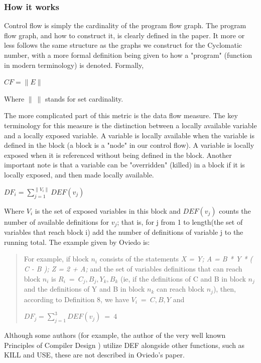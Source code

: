 \documentclass[]{article}
\begin{document}
\subsubsection{How it works}

Control flow is simply the cardinality of the program flow graph.
The program flow graph, and how to construct it, is clearly defined in the paper.
It more or less follows the same structure as the graphs we construct for the Cyclomatic number, with a more formal definition being given to how a "program" (function in modern terminology) is denoted.
Formally,

$CF=\parallel E\parallel$

Where $\parallel ~\parallel$ stands for set cardinality.

The more complicated part of this metric is the data flow measure.
The key terminology for this measure is the distinction between a locally available variable and a locally exposed variable.
A variable is locally available when the variable is defined in the block (a block is a "node" in our control flow).
A variable is locally exposed when it is referenced without being defined in the block.
Another important note is that a variable can be "overridden" (killed) in a block if it is locally exposed, and then made locally available.

$DF_i = \sum\limits_{j=1}^{\parallel V_i \parallel} DEF(v_j)$

Where $V_i$ is the set of exposed variables in this block and $DEF(v_j)$ counts the number of available definitions for $v_j$; that is, for j from 1 to length(the set of variables that reach block i) add the number of definitions of variable j to the running total.
The example given by Oviedo is:
\begin{quotation}
	For example, if block $n_i$ consists of the statements \textit{X = Y; A = B * Y * ( C - B ); Z = 2 + A;} and the set of variables definitions that can reach block $n_i$ is $R_i ~= ~{C_j, B_j, Y_k, B_k}$ (ie, if the definitions of C and B in block $n_j$ and the definitions of Y and B in block $n_k$ can reach block $n_j$), then, according to Definition 8, we have $V_i ~= ~{C,B,Y}$ and
	
	$DF_j = \sum\limits_{j=1}^{3} DEF(v_j)~=~4$ \cite{ref:oviedo1993control}
\end{quotation}

Although some authors (for example, the author of the very well known Principles of Compiler Design \cite{aho1977principles}) utilize DEF alongside other functions, such as KILL and USE, these are not described in Oviedo's paper.
\end{document}
